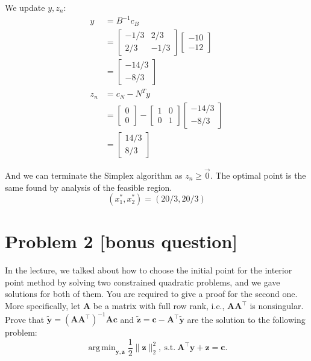 \documentclass[12pt]{article}
\newcommand{\vc}{{\mathbf{c}}}
\newcommand{\vy}{{\mathbf{y}}}
\newcommand{\vz}{{\mathbf{z}}}
\newcommand{\vA}{{\mathbf{A}}}
\newcommand{\st}{{\text{s.t.}}} %
\DeclareMathOperator*{\argmin}{arg\,min}
\begin{document}
We update $y, z_n$:
\begin{align*}
y &= B^{-1}c_B \\
&= \left[\begin{array}{cc} -1/3 & 2/3 \\ 2/3 & -1/3 \end{array}\right]\left[\begin{array}{c} -10 \\ -12 \end{array}\right]\\
&= \left[\begin{array}{c} -14/3 \\ -8/3 \end{array}\right] \\
z_n &= c_N - N^Ty \\
&= \left[\begin{array}{c} 0 \\ 0 \end{array}\right] - \left[\begin{array}{cc} 1&0 \\ 0&1 \end{array}\right]\left[\begin{array}{c} -14/3 \\ -8/3 \end{array}\right] \\
&= \left[\begin{array}{c} 14/3 \\ 8/3 \end{array}\right]
\end{align*}

And we can terminate the Simplex algorithm as $z_n \ge \vec{0}$. The optimal point is the same found by analysis of the feasible region. 
$$
(x_1^*, x_2^*) = (20/3, 20/3)
$$
\newpage

\section*{Problem 2 {\normalsize [bonus question]}}
In the lecture, we talked about how to choose the initial point for the interior point method by solving two constrained quadratic problems, and we gave solutions for both of them. You are required to give a proof for the second one. More specifically, let $\vA$ be a matrix with full row rank, i.e., $\vA\vA^\top$ is nonsingular. Prove that $\tilde\vy = (\vA\vA^\top)^{-1}\vA\vc$ and $\tilde\vz = \vc-\vA^\top\tilde\vy$ are the solution to the following problem:
$$\argmin_{\vy,\vz} \frac{1}{2}\|\vz\|_2^2, \ \st\ \vA^\top \vy + \vz = \vc.$$
\end{document}
